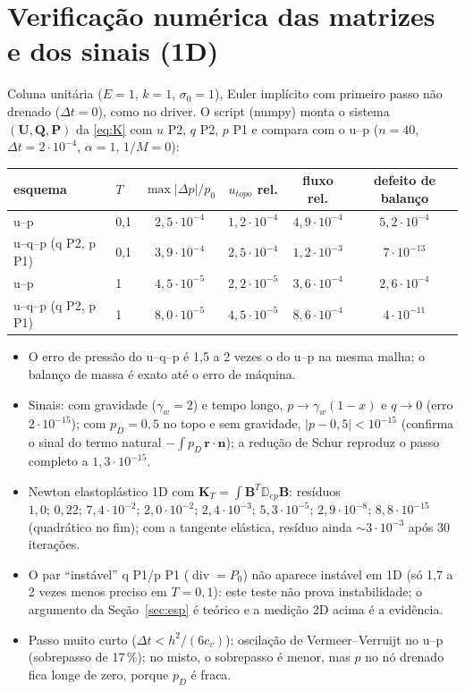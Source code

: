 \documentclass[11pt,a4paper]{article}
\newcommand{\cc}[1]{\texttt{\detokenize{#1}}}
\newcommand{\br}{\boldsymbol{r}}\newcommand{\bn}{\boldsymbol{n}}\newcommand{\bb}{\boldsymbol{b}}
\newcommand{\Kt}{\mathbf{K}_T}\newcommand{\Qc}{\mathbf{Q}_c}
\begin{document}
\section{Verificação numérica das matrizes e dos sinais (1D)}
Coluna unitária ($E=1$, $k=1$, $\sigma_0=1$), Euler implícito com primeiro passo não drenado ($\Delta t=0$), como no driver. O script
\cc{scripts/uqp/terzaghi_uqp.py} (numpy) monta o sistema $(\mathbf U,\mathbf Q,\mathbf P)$ da \eqref{eq:K} com $u$ P2, $q$ P2, $p$ P1 e compara com o u--p
($n=40$, $\Delta t=2\cdot10^{-4}$, $\alpha=1$, $1/M=0$):
\begin{center}\small
\begin{tabular}{llcccc}
\toprule
esquema & $T$ & $\max|\Delta p|/p_0$ & $u_{topo}$ rel. & fluxo rel. & defeito de balanço\\\midrule
u--p & 0,1 & $2{,}5\cdot10^{-4}$ & $1{,}2\cdot10^{-4}$ & $4{,}9\cdot10^{-4}$ & $5{,}2\cdot10^{-4}$\\
u--q--p (q P2, p P1) & 0,1 & $3{,}9\cdot10^{-4}$ & $2{,}5\cdot10^{-4}$ & $1{,}2\cdot10^{-3}$ & $7\cdot10^{-13}$\\
u--p & 1 & $4{,}5\cdot10^{-5}$ & $2{,}2\cdot10^{-5}$ & $3{,}6\cdot10^{-4}$ & $2{,}6\cdot10^{-4}$\\
u--q--p (q P2, p P1) & 1 & $8{,}0\cdot10^{-5}$ & $4{,}5\cdot10^{-5}$ & $8{,}6\cdot10^{-4}$ & $4\cdot10^{-11}$\\\bottomrule
\end{tabular}
\end{center}
\begin{itemize}
\item O erro de pressão do u--q--p é 1,5 a 2 vezes o do u--p na mesma malha; o balanço de massa é exato até o erro de máquina.
\item Sinais: com gravidade ($\gamma_w=2$) e tempo longo, $p\to\gamma_w(1-x)$ e $q\to0$ (erro $2\cdot10^{-15}$); com $p_D=0{,}5$ no topo e sem gravidade, $|p-0{,}5|<10^{-15}$
  (confirma o sinal do termo natural $-\int p_D\,\br\cdot\bn$); a redução de Schur reproduz o passo completo a $1{,}3\cdot10^{-15}$.
\item Newton elastoplástico 1D com $\Kt=\int\mathbf B^T\mathbb D_{ep}\mathbf B$: resíduos $1{,}0;\,0{,}22;\,7{,}4\cdot10^{-2};\,2{,}0\cdot10^{-2};\,2{,}4\cdot10^{-3};\,5{,}3\cdot10^{-5};\,2{,}9\cdot10^{-8};\,8{,}8\cdot10^{-15}$
  (quadrático no fim); com a tangente elástica, resíduo ainda $\sim3\cdot10^{-3}$ após 30 iterações.
\item O par ``instável'' q P1/p P1 ($\operatorname{div}=P_0$) não aparece instável em 1D (só 1,7 a 2 vezes menos preciso em $T=0{,}1$): este teste não prova instabilidade; o
  argumento da Seção~\ref{sec:esp} é teórico e a medição 2D acima é a evidência.
\item Passo muito curto ($\Delta t<h^2/(6c_v)$): oscilação de Vermeer--Verruijt no u--p (sobrepasso de 17\,\%); no misto, o sobrepasso é menor, mas $p$ no nó drenado fica longe de zero,
  porque $p_D$ é fraca.
\end{itemize}
\end{document}
